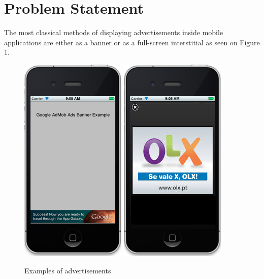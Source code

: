 
\chapter{Problem Statement} %


The most classical methods of displaying advertisements inside mobile applications are either as a banner or as a full-screen interstitial as seen on Figure 1.


\begin{figure}
\centering
\includegraphics[scale=1]{Images/banner.png}
\includegraphics[scale=1]{Images/fullscreen.png}
\caption{Examples of advertisements \cite{image:banner_ad} \cite{image:interstitial_ad}}
\end{figure}

